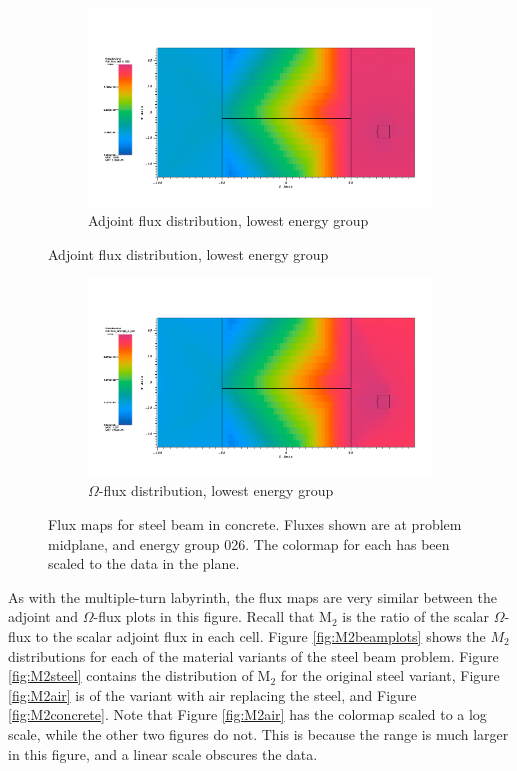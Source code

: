 \begin{figure}[htb!]
  \centering
  \begin{subfigure}[t]{\textwidth}
    \includegraphics[width=0.9\linewidth]{./chapters/characterization_probs/figures/char/prob_1/prob1adjG26.png}
    \caption{Adjoint flux distribution, lowest energy group}
    \label{fig:steelbeamadj}
  \end{subfigure}
\end{figure}
\begin{figure}[htb!]\ContinuedFloat
  \centering
  \begin{subfigure}[t]{\textwidth}
    \includegraphics[width=0.9\linewidth]{./chapters/characterization_probs/figures/char/prob_1/prob1omegaG26.png}
    \caption{$\Omega$-flux distribution, lowest energy group}
    \label{fig:steelbeamomega}
  \end{subfigure}
  \caption[Flux maps for steel beam in concrete.]{Flux maps for steel beam in
  concrete. Fluxes shown are at problem midplane, and energy group 026. The
  colormap for each has been scaled to the data in the plane.}
  \label{fig:steelbeamfluxes}
\end{figure}

As with the multiple-turn
labyrinth, the flux maps are very similar between the adjoint and $\Omega$-flux
plots in this figure. Recall that M$_2$ is the ratio of the scalar $\Omega$-flux
to the scalar adjoint flux in each cell. Figure \ref{fig:M2beamplots} shows the
$M_2$ distributions for each of the material variants of the steel beam problem.
Figure \ref{fig:M2steel} contains the distribution of M$_2$ for the original
steel variant, Figure \ref{fig:M2air} is of the variant with air replacing the
steel, and Figure \ref{fig:M2concrete}. Note that Figure \ref{fig:M2air} has the
colormap scaled to a log scale, while the other two figures do not. This is
because the range is much larger in this figure, and a linear scale obscures the
data.

